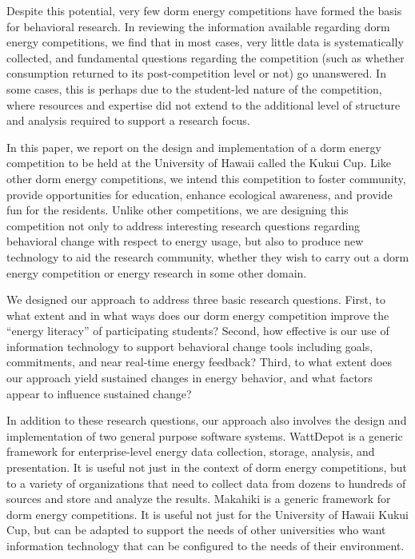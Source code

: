 \documentclass[conference,compsoc,peerreview]{IEEEtran}
\begin{document}
Despite this potential, very few dorm energy competitions have formed the
basis for behavioral research.  In reviewing the information available
regarding dorm energy competitions, we find that in most cases, very little
data is systematically collected, and fundamental questions regarding the
competition (such as whether consumption returned to its post-competition
level or not) go unanswered.  In some cases, this is perhaps due to the
student-led nature of the competition, where resources and expertise did
not extend to the additional level of structure and analysis required to
support a research focus.

In this paper, we report on the design and implementation of a dorm energy
competition to be held at the University of Hawaii called the Kukui Cup.
Like other dorm energy competitions, we intend this competition to foster
community, provide opportunities for education, enhance ecological
awareness, and provide fun for the residents.  Unlike other competitions,
we are designing this competition not only to address interesting research
questions regarding behavioral change with respect to energy usage, but
also to produce new technology to aid the research community, whether they
wish to carry out a dorm energy competition or energy research in some
other domain. 

We designed our approach to address three basic research questions.  First,
to what extent and in what ways does our dorm energy competition improve
the ``energy literacy'' of participating students?  Second, how effective
is our use of information technology to support behavioral change tools
including goals, commitments, and near real-time energy feedback? Third, to
what extent does our approach yield sustained changes in energy behavior,
and what factors appear to influence sustained change?

In addition to these research questions, our approach also involves the
design and implementation of two general purpose software systems.
WattDepot is a generic framework for enterprise-level energy data
collection, storage, analysis, and presentation.  It is useful not just in
the context of dorm energy competitions, but to a variety of organizations
that need to collect data from dozens to hundreds of sources and store and
analyze the results.  Makahiki is a generic framework for dorm energy
competitions.  It is useful not just for the University of Hawaii Kukui
Cup, but can be adapted to support the needs of other universities who want
information technology that can be configured to the needs of their
environment.
\end{document}
